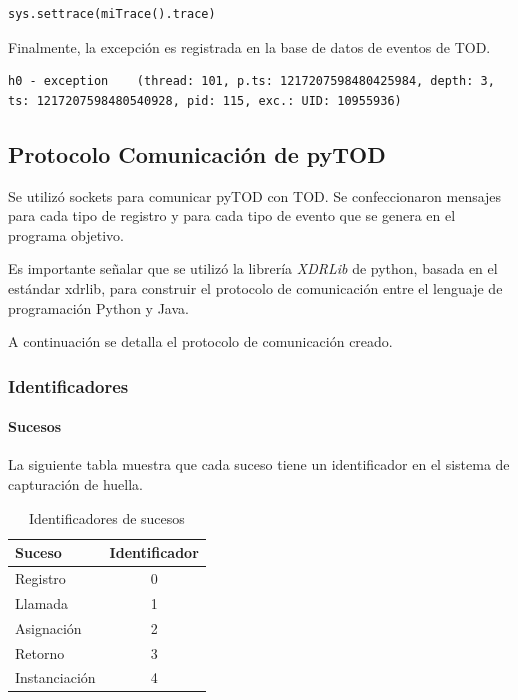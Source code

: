 \documentclass[12pt,legalpaper]{report}
\begin{document}
\begin{itemize}
\begin{singlespace}
\begin{lstlisting}[style=Python]
sys.settrace(miTrace().trace)
\end{lstlisting}
\end{singlespace}	
\end{itemize}		

Finalmente, la excepción es registrada en la base de datos de eventos de TOD.

\begin{singlespace}
\begin{lstlisting}[style=consola,numbers=none]
h0 - exception    (thread: 101, p.ts: 1217207598480425984, depth: 3, ts: 1217207598480540928, pid: 115, exc.: UID: 10955936)
\end{lstlisting}
\end{singlespace}	

		\subsection{Protocolo Comunicación de pyTOD}

Se utilizó sockets para comunicar pyTOD con TOD.  Se confeccionaron mensajes para cada tipo de registro y para cada tipo de evento que se genera en el programa objetivo.

Es importante señalar que se utilizó la librería \textit{XDRLib} \cite{xdrlib} de python, basada en el estándar xdrlib\cite{xdrlibestandar}, para construir el protocolo de comunicación entre el lenguaje de programación Python y Java.

A continuación se detalla el protocolo de comunicación creado.

			\subsubsection{Identificadores}

				\paragraph{Sucesos}

La siguiente tabla muestra que cada suceso tiene un identificador en el sistema de capturación de huella.
\begin{table}[!h]
\begin{center}
\begin{tabular}{|l | c |}
\hline
\rowcolor[gray]{0.9}Suceso & Identificador\\
\hline
Registro & 0\\
\hline
Llamada & 1\\
\hline
Asignación & 2\\
\hline
Retorno & 3\\
\hline
Instanciación & 4\\
\hline
\end{tabular}
\caption{Identificadores de sucesos} 
\end{center}
\end{table}
\end{document}
